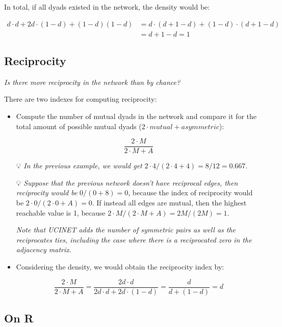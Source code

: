 \documentclass[
  notitlepage,
  onecolumn,
  openany]{book}
\begin{document}
In total, if all dyads existed in the network, the density would be:

\[
\begin{aligned}
d \cdot d+2d\cdot (1-d)+(1-d)(1-d)&= d\cdot(d+1-d)+(1-d)\cdot(d+1-d) \\
&= d+1-d = 1
\end{aligned}
\]

\hypertarget{reciprocity}{%
\subsection{Reciprocity}\label{reciprocity}}

\emph{Is there more reciprocity in the network than by chance?}

There are two indexes for computing reciprocity:

\begin{itemize}
\item
  Compute the number of mutual dyads in the network and compare it for the total amount of possible mutual dyads (\(2 \cdot mutual + asymmetric\)):

  \[
    \frac{2\cdot M}{2\cdot M+A}
    \]

  💡 \emph{In the previous example, we would get} \(2\cdot4/(2\cdot4+4) = 8/12 = 0.667\).

  💡 \emph{Suppose that the previous network doesn't have reciprocal edges, then reciprocity would be} \(0/(0+8) = 0\), because the index of reciprocity would be \(2\cdot 0/(2\cdot 0+A) = 0\). If instead all edges are mutual, then the highest reachable value is 1, because \(2\cdot M/(2\cdot M+A) = 2M/(2M) = 1\).

  \emph{Note that UCINET adds the number of symmetric pairs as well as the reciprocates ties, including the case where there is a reciprocated zero in the adjacency matrix}.\\
\item
  Considering the density, we would obtain the reciprocity index by:

  \[
    \frac{2\cdot M}{2\cdot M+A} = \frac{2d\cdot d}{2 d\cdot d+2d\cdot(1-d)} = \frac{d}{d+(1-d)} = d
    \]
\end{itemize}

\hypertarget{on-r}{%
\subsection{On R}\label{on-r}}
\end{document}
